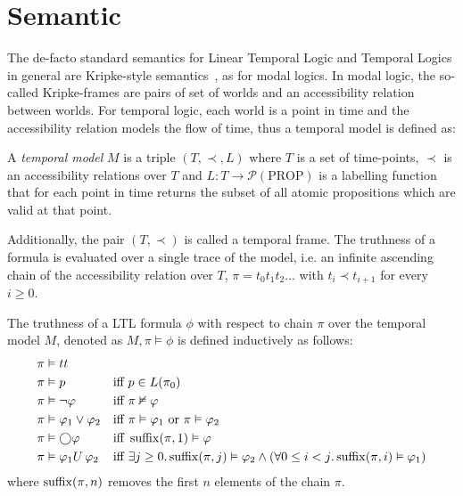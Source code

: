 \section{Semantic}

The de-facto standard semantics for Linear Temporal Logic and Temporal Logics in general are Kripke-style
semantics~\cite{gasquet_kripkes_2011}, as for modal logics. In modal logic, the so-called Kripke-frames are pairs of set
of worlds and an accessibility relation between worlds. For temporal logic, each world is a point in time and the
accessibility relation models the flow of time, thus a temporal model is defined as:

\begin{definition}
  A \emph{temporal model} $M$ is a triple $(T, \prec, L)$ where $T$ is a set of time-points, $\prec$ is an accessibility
  relations over $T$ and $L : T \to \mathcal{P}(\text{PROP})$ is a labelling function that for each point in time
  returns the subset of all atomic propositions which are valid at that point.
\end{definition}

Additionally, the pair $(T, \prec)$ is called a temporal frame. The truthness of a formula is evaluated over a single
trace of the model, i.e. an infinite ascending chain of the accessibility relation over $T$,
$\pi = t_0t_1t_2\ldots$ with $t_i \prec t_{i+1}$ for every $i \geq 0$.

\begin{definition}
  The truthness of a LTL formula $\phi$ with respect to chain $\pi$ over the temporal model $M$, denoted as
  $M, \pi \vDash \phi$ is defined inductively as follows:
  \begin{align*}
    \pi &\vDash tt && \\
    \pi &\vDash p &&\text{iff } p \in L(\pi_0) \\
    \pi &\vDash \neg\varphi &&\text{iff } \pi \nvDash \varphi \\
    \pi &\vDash \varphi_1 \lor \varphi_2 &&\text{iff } \pi \vDash \varphi_1 \text{ or } \pi \vDash \varphi_2 \\
    \pi &\vDash \bigcirc{\varphi} &&\text{iff } \operatorname{suffix}(\pi, 1) \vDash \varphi \\
    \pi &\vDash {\varphi_1}U\,{\varphi_2} &&\text{iff } \exists {j \geq 0} \ldotp {\operatorname{suffix}(\pi, j) \vDash \varphi_2 \land
      (\forall {0 \leq i < j} \ldotp {\operatorname{suffix}(\pi, i) \vDash \varphi_1})}
  \end{align*}
  where $\operatorname{suffix}(\pi, n)$ removes the first $n$ elements of the chain $\pi$.
\end{definition}

